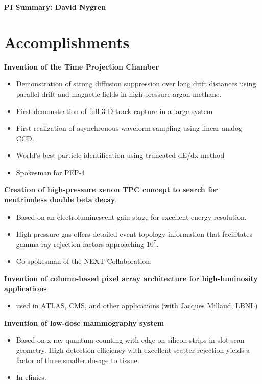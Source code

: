 
\begin{center}
\Large\textbf{PI Summary: David Nygren}
\end{center}


\section*{\textbf{Accomplishments}}


\noindent\textbf{Invention of the Time Projection Chamber}
\begin{itemize}[noitemsep,nolistsep]
\item{Demonstration of strong diffusion suppression over long drift distances using parallel drift and magnetic fields in high-pressure argon-methane.}
\item{First demonstration of full 3-D track capture in a large system}
\item{First realization of asynchronous waveform sampling using linear analog CCD.}
\item{World's best particle identification using truncated dE/dx method}
\item{Spokesman for PEP-4}
\end{itemize}


\noindent\textbf{Creation of high-pressure xenon TPC concept to search for neutrinoless double beta decay}, 
\begin{itemize}[noitemsep,nolistsep]
\item{Based on an electroluminescent gain stage for excellent energy resolution.}
\item{High-pressure gas offers detailed event topology information that facilitates gamma-ray rejection factors approaching $10^7$.}
\item{Co-spokesman of the NEXT Collaboration.}
\end{itemize}

\noindent\textbf{Invention of column-based pixel array architecture for high-luminosity applications}
\begin{itemize}[noitemsep,nolistsep]
\item{used in ATLAS, CMS, and other applications (with Jacques Millaud, LBNL)}
\end{itemize}

\noindent\textbf{Invention of low-dose mammography system} 
\begin{itemize}[noitemsep,nolistsep]
\item{Based on x-ray quantum-counting with edge-on silicon strips in slot-scan geometry. High detection efficiency with excellent scatter rejection yields a factor of three smaller dosage to tissue.}
\item{In clinics.}
\end{itemize}

